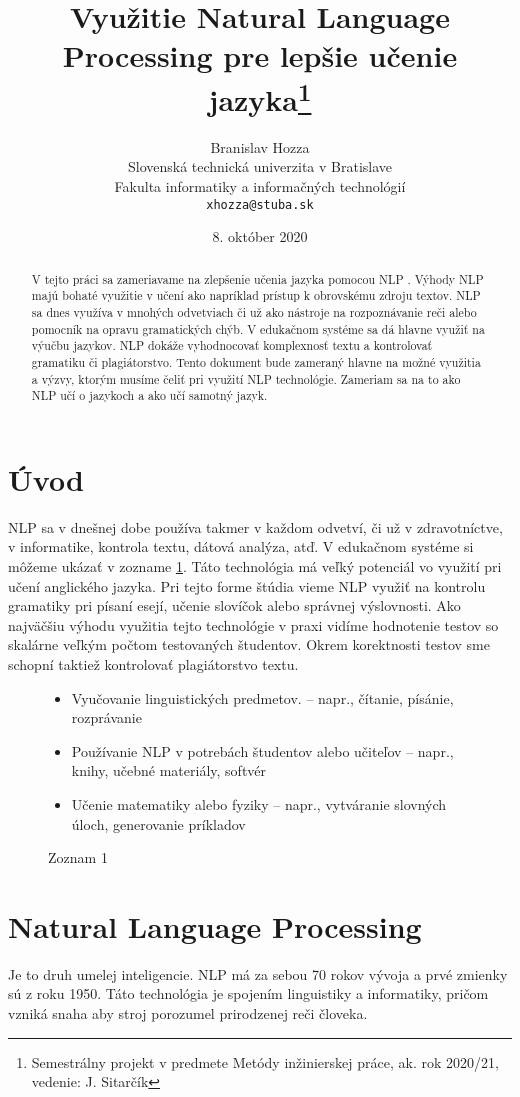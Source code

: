 \documentclass[10pt,twoside,slovak,a4paper]{article}
\title{Využitie Natural Language Processing pre lepšie učenie jazyka\thanks{Semestrálny projekt v predmete Metódy inžinierskej práce, ak. rok 2020/21, vedenie: J. Sitarčík}}
\author{Branislav Hozza\\[2pt]
	{\small Slovenská technická univerzita v Bratislave}\\
	{\small Fakulta informatiky a informačných technológií}\\
	{\small \texttt{xhozza@stuba.sk}}
	}
\date{\small 8. október 2020}
\begin{document}
\maketitle

\begin{abstract}
	V tejto práci sa zameriavame na zlepšenie učenia jazyka pomocou NLP \cite{NLP}. Výhody NLP majú bohaté využitie v učení ako napríklad prístup k obrovskému zdroju textov. NLP sa dnes využíva v mnohých odvetviach či už ako nástroje na rozpoznávanie reči alebo pomocník na opravu gramatických chýb. V edukačnom systéme sa dá hlavne využiť na výučbu jazykov. NLP dokáže vyhodnocovať komplexnosť textu a kontrolovať gramatiku či plagiátorstvo. Tento dokument bude zameraný hlavne na možné využitia a výzvy, ktorým musíme čeliť pri využití NLP technológie. Zameriam sa na to ako NLP učí o jazykoch a ako učí samotný jazyk.
\end{abstract}



\section{Úvod}

NLP sa v dnešnej dobe používa takmer v každom odvetví, či už v zdravotníctve, v informatike, kontrola textu, dátová analýza, atď. V edukačnom systéme si môžeme ukázať v zozname \ref{zoznam_1}.
Táto technológia má veľký potenciál vo využití pri učení anglického jazyka. Pri tejto forme štúdia vieme NLP využiť na kontrolu gramatiky pri písaní esejí, učenie slovíčok alebo správnej výslovnosti.
Ako najväčšiu výhodu využitia tejto technológie v praxi vidíme hodnotenie testov so skalárne veľkým počtom testovaných študentov. Okrem korektnosti testov sme schopní taktiež kontrolovať plagiátorstvo textu.
\begin{figure}[H]
	\centering
	\begin{itemize}\label{zoznam_1}
			\item Vyučovanie linguistických predmetov.
			– napr., čítanie, písánie, rozprávanie
			\item Používanie NLP v potrebách študentov alebo učiteľov
			– napr., knihy, učebné materiály, softvér
			\item Učenie matematiky alebo fyziky
			– napr., vytváranie slovných úloch, generovanie príkladov
			\end{itemize}
	\caption{Zoznam 1}
\end{figure}
\section{Natural Language Processing} \label{NLP}
Je to druh umelej inteligencie. NLP má za sebou 70 rokov vývoja a prvé zmienky sú z roku 1950\cite{historia}. Táto technológia je spojením linguistiky a informatiky, pričom vzniká snaha aby stroj porozumel prirodzenej reči človeka.
\end{document}
